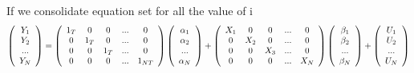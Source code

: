 \documentclass[a4paper]{article}
\begin{document}
If we consolidate equation set for all the value of i
\begin{align*}
 \left( \begin{array} { c  } 
                   Y_{1}  \\
                   Y_{2}  \\
                   ... \\
                   Y_{N} \\
           \end{array} \right)
       = \left( \begin{array} { c c c c c } 
                 1_{T} & 0 & 0 & ... & 0\\
                 0 & 1_{T} & 0 & ...& 0\\
                 0 & 0 & 1_{T} & ...& 0\\
                 0 &  0 & 0 & ... &1_{NT}\\
           \end{array} \right)
            \left( \begin{array} { c } 
                   \alpha_{1}  \\
                   \alpha_{2}  \\
                   ... \\
                   \alpha_{N} \\
           \end{array} \right) +
\left( \begin{array} { c c c c c } 
                 X_{1} & 0 & 0 & ... & 0\\
                 0 & X_{2} & 0 & ...& 0\\
                 0 & 0 & X_{3} & ...& 0\\
                 0 &  0 & 0 & ... &X_{N}\\
           \end{array} \right)
            \left( \begin{array} { c } 
                   \beta_{1}  \\
                   \beta_{2}  \\
                   ... \\
                   \beta_{N} \\
           \end{array} \right)
               +
            \left( \begin{array} { c  } 
                   U_{1}  \\
                   U_{2}  \\
                   ... \\
                   U_{N} \\
           \end{array} \right)
\end{align*}
\end{document}
